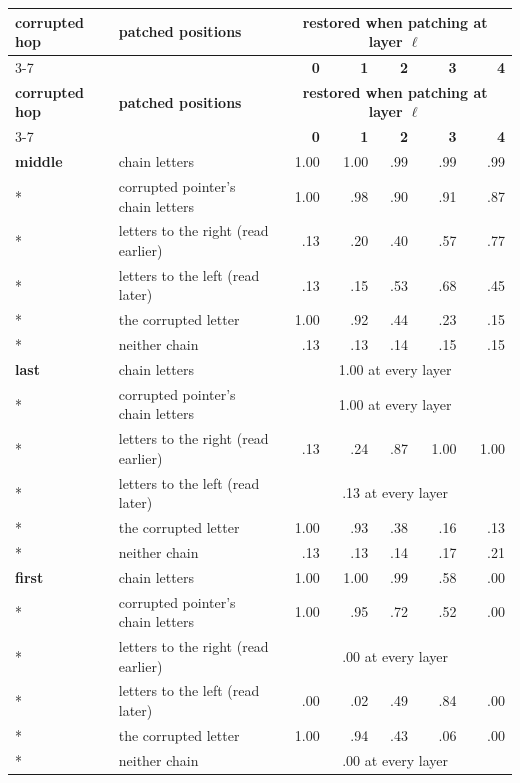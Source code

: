 \documentclass[paper=a4,fontsize=11pt,DIV=11,parskip=half,headings=small,numbers=noendperiod]{scrartcl}
\DeclareRobustCommand{\hdr}[1]{\textsf{\bfseries #1}}
\begin{document}
{\small\nopagebreak[4]
\begin{longtable}{@{}l >{\raggedright\arraybackslash}p{5.4cm} *{5}{r}@{}}
\toprule
\hdr{corrupted hop} & \hdr{patched positions} & \multicolumn{5}{c}{\hdr{restored when patching at layer $\ell$}} \\
\cmidrule(lr){3-7}
 & & \hdr{0} & \hdr{1} & \hdr{2} & \hdr{3} & \hdr{4} \\
\midrule
\endfirsthead
\toprule
\hdr{corrupted hop} & \hdr{patched positions} & \multicolumn{5}{c}{\hdr{restored when patching at layer $\ell$}} \\
\cmidrule(lr){3-7}
 & & \hdr{0} & \hdr{1} & \hdr{2} & \hdr{3} & \hdr{4} \\
\midrule
\endhead
\bottomrule
\endlastfoot
\textbf{middle} & chain letters & 1.00 & 1.00 & .99 & .99 & .99 \\*
 & corrupted pointer’s chain letters & 1.00 & .98 & .90 & .91 & .87 \\*
 & letters to the right (read earlier) & .13 & .20 & .40 & .57 & .77 \\*
 & letters to the left (read later) & .13 & .15 & .53 & .68 & .45 \\*
 & the corrupted letter & 1.00 & .92 & .44 & .23 & .15 \\*
 & neither chain & .13 & .13 & .14 & .15 & .15 \\
\addlinespace[4pt]
\textbf{last} & chain letters & \multicolumn{5}{c}{1.00 at every layer} \\*
 & corrupted pointer’s chain letters & \multicolumn{5}{c}{1.00 at every layer} \\*
 & letters to the right (read earlier) & .13 & .24 & .87 & 1.00 & 1.00 \\*
 & letters to the left (read later) & \multicolumn{5}{c}{.13 at every layer} \\*
 & the corrupted letter & 1.00 & .93 & .38 & .16 & .13 \\*
 & neither chain & .13 & .13 & .14 & .17 & .21 \\
\addlinespace[4pt]
\textbf{first} & chain letters & 1.00 & 1.00 & .99 & .58 & .00 \\*
 & corrupted pointer’s chain letters & 1.00 & .95 & .72 & .52 & .00 \\*
 & letters to the right (read earlier) & \multicolumn{5}{c}{.00 at every layer} \\*
 & letters to the left (read later) & .00 & .02 & .49 & .84 & .00 \\*
 & the corrupted letter & 1.00 & .94 & .43 & .06 & .00 \\*
 & neither chain & \multicolumn{5}{c}{.00 at every layer} \\
\end{longtable}}
\end{document}
